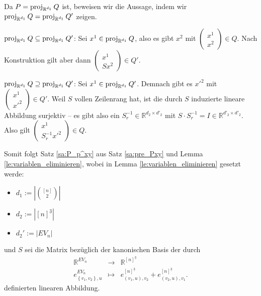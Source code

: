 \documentclass[10p,a4paper,BCOR = 12mm, DIV=15]{scrbook}
\begin{document}
\begin{bew}
Da $P = \operatorname{proj}_{\mathbb{R}^{d_1}} Q$ ist, beweisen wir die Aussage, indem wir $\operatorname{proj}_{\mathbb{R}^{d_1}} Q = \operatorname{proj}_{\mathbb{R}^{d_1}} Q'$ zeigen.

$\operatorname{proj}_{\mathbb{R}^{d_1}} Q \subseteq \operatorname{proj}_{\mathbb{R}^{d_1}} Q'$:
Sei $x^1 \in \operatorname{proj}_{\mathbb{R}^{d_1}} Q$, also es gibt $x^2$ mit $\left(\begin{array}{c}
x^1 \\
x^2
\end{array}\right) \in Q$. Nach Konstruktion gilt aber dann $\left(\begin{array}{c}
x^1 \\
S x^2
\end{array}\right) \in Q'$.

$\operatorname{proj}_{\mathbb{R}^{d_1}} Q \supseteq \operatorname{proj}_{\mathbb{R}^{d_1}} Q'$:
Sei $x^1 \in \operatorname{proj}_{\mathbb{R}^{d_1}} Q'$. Demnach gibt es $x'^2$ mit $\left(\begin{array}{c}
x^1 \\
x'^2
\end{array}\right) \in Q'$. Weil $S$ vollen Zeilenrang hat, ist die durch $S$ induzierte lineare Abbildung surjektiv -- es gibt also ein $S^{-1}_r \in \mathbb{R}^{d_2 \times d'_2}$ mit $S \cdot S^{-1}_r = I \in \mathbb{R}^{d'_2 \times d'_2}$. Also gilt
$\left(\begin{array}{c}
x^1 \\
S^{-1}_r x'^2
\end{array}\right) \in Q$.
\end{bew}

Somit folgt Satz \ref{sa:P_p^xy} aus Satz \ref{sa:pre_Pxy} und Lemma \ref{le:variablen_eliminieren}, wobei in Lemma \ref{le:variablen_eliminieren} gesetzt werde:
\begin{itemize}
\item $d_1 := \left|{\left[n\right] \choose 2}\right|$
\item $d_2 := \left|[n]^{\underline{3}}\right|$
\item $d_2' := \left|EV_n\right|$
\end{itemize}
und $S$ sei die Matrix bezüglich der kanonischen Basis der durch
\begin{eqnarray*}
\mathbb{R}^{EV_n} & \rightarrow & \mathbb{R}^{[n]^{\underline{3}}} \\
e^{EV_n}_{\left\{v_1, v_2\right\}, u} & \mapsto & e^{[n]^{\underline{3}}}_{\left(v_1, u\right), v_2}+e^{[n]^{\underline{3}}}_{\left(v_2, u\right), v_1}.
\end{eqnarray*}
definierten linearen Abbildung.
\end{document}
